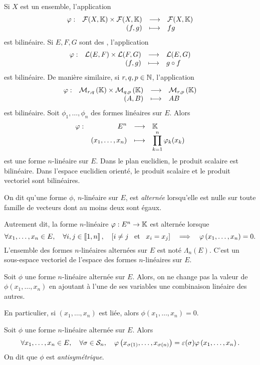 \documentclass{magnolia}
\begin{document}
\begin{exemples}
\exemple Si $X$ est un ensemble, l'application
  \[\begin{array}[t]{lrcl} \displaystyle{\varphi} : & \displaystyle{\mathcal{F}(X,\ensuremath{\mathbb{K}})\times\mathcal{F}(X,\ensuremath{\mathbb{K}})} & \longrightarrow & \displaystyle{\mathcal{F}(X,\ensuremath{\mathbb{K}})} \\ & \displaystyle{(f,g)} & \longmapsto & \displaystyle{fg} \end{array}\]
  est bilinéaire.
\exemple Si $E,F,G$ sont des \Kevs, l'application
  \[\begin{array}[t]{lrcl} \displaystyle{\varphi} : & \displaystyle{\mathcal{L}(E,F)\times\mathcal{L}(F,G)} & \longrightarrow & \displaystyle{\mathcal{L}(E,G)} \\ & \displaystyle{(f,g)} & \longmapsto & \displaystyle{g\circ f} \end{array}\]
  est bilinéaire. De manière similaire, si $r,q,p\in\mathbb{N}$, l'application
  \[\begin{array}[t]{lrcl} \displaystyle{\varphi} : & \displaystyle{\mathcal{M}_{r,q}\left(\ensuremath{\mathbb{K}}\right)\times\mathcal{M}_{q,p}\left(\ensuremath{\mathbb{K}}\right)} & \longrightarrow & \displaystyle{\mathcal{M}_{r,p}\left(\ensuremath{\mathbb{K}}\right)} \\ & \displaystyle{(A,B)} & \longmapsto & \displaystyle{AB} \end{array}\]
  est bilinéaire.
\exemple Soit $\phi_1,\ldots,\phi_n$ des formes linéaires sur $E$. Alors
  \[\begin{array}[t]{lrcl} \displaystyle{\varphi} : & \displaystyle{E^n} & \longrightarrow & \displaystyle{\ensuremath{\mathbb{K}}} \\ & \displaystyle{(x_1,\ldots,x_n)} & \longmapsto & \displaystyle{\prod_{k=1}^n \varphi_k(x_k)} \end{array}\]
  est une forme $n$-linéaire sur $E$.
\exemple Dans le plan euclidien, le produit scalaire est bilinéaire. Dans l'espace euclidien orienté, le
  produit scalaire et le produit vectoriel sont bilinéaires.
\end{exemples}

\begin{definition}
On dit qu'une forme $\phi$, $n$-linéaire sur $E$, est \emph{alternée} lorsqu'elle est nulle sur toute
famille de vecteurs dont au moins deux sont égaux.
\end{definition}

\begin{remarques}
\remarque Autrement dit, la forme $n$-linéaire $\varphi:E^n\to\mathbb{K}$ est alternée lorsque
  \[\forall x_1,\ldots,x_n\in E,\quad \forall i,j\in\left\llbracket 1,n\right\rrbracket,\quad \left[i\neq j \quad\!\text{et}\quad\! x_i=x_j\right]
    \quad\Longrightarrow\quad \varphi\left(x_1,\ldots,x_n\right)=0.\]
\remarque L'ensemble des formes $n$-linéaires alternées sur $E$ est noté $\Lambda_n(E)$. C'est
  un sous-espace vectoriel de l'espace des formes $n$-linéaires sur $E$.
\end{remarques}

\begin{proposition}
Soit $\phi$ une forme $n$-linéaire alternée sur $E$. Alors, on ne change pas la valeur de
$\phi(x_1,\ldots,x_n)$ en ajoutant à l'une de ses variables une combinaison linéaire des autres.
\end{proposition}

\begin{remarqueUnique}
\remarque En particulier, si $(x_1,\ldots,x_n)$ est liée, alors $\phi(x_1,\ldots,x_n)=0$.
\end{remarqueUnique}

\begin{proposition}
Soit $\phi$ une forme $n$-linéaire alternée sur $E$. Alors
\[\forall x_1,\ldots,x_n\in E \qsep \forall \sigma\in\gsym{n} \qsep
  \phi\p{x_{\sigma\p{1}},\ldots,x_{\sigma(n)}}=\signature(\sigma)
  \phi\p{x_1,\ldots,x_n}.\]
On dit que $\phi$ est \emph{antisymétrique}.
\end{proposition}
\end{document}
